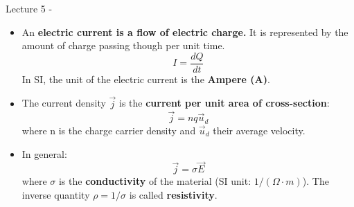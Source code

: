 
\renewcommand{\summarizedlecture}{5 }

%
%
%

\begin{frame}{Lecture \summarizedlecture - \lecturesummarytitle}

\begin{itemize}

\item
An {\bf electric current is a flow of electric charge.}
It is represented by the amount of charge passing though per unit time.
\begin{equation*}
  I = \frac{dQ}{dt}
\end{equation*}
In SI, the unit of the electric current is the {\bf Ampere (A)}.

\item
The current density $\vec{j}$ is the {\bf current per unit area  of cross-section}:
\begin{equation*}
  \vec{j} = n q \vec{u}_{d}
\end{equation*}
where n is the charge carrier density and $\vec{u}_{d}$ their average velocity.

\item
In general:
\begin{equation*}
  \vec{j} = \sigma \vec{E}
\end{equation*}
where $\sigma$ is the {\bf conductivity} of the material (SI unit: $1/(\Omega \cdot m)$).
The inverse quantity $\rho = 1/\sigma$ is called {\bf resistivity}.

\end{itemize}

\end{frame}

